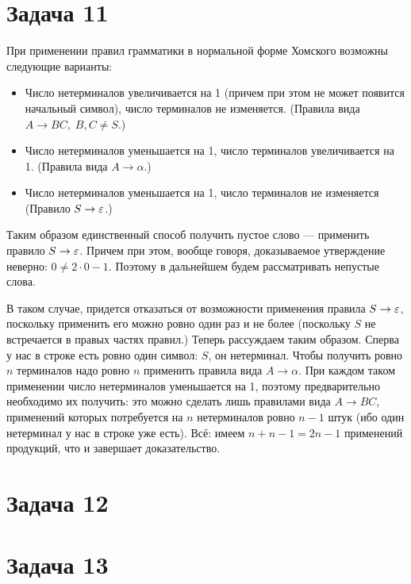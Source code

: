 \documentclass[12pt]{article}
\begin{document}
\section{Задача 11}
При применении правил грамматики в нормальной форме Хомского возможны следующие варианты:
\begin{itemize}
    \item Число нетерминалов увеличивается на 1 (причем при этом не может появится начальный символ), число терминалов не изменяется. (Правила вида $A\to BC,\;B,C\ne S$.)
    \item Число нетерминалов уменьшается на 1, число терминалов увеличивается на 1. (Правила вида $A\to \alpha$.)
    \item Число нетерминалов уменьшается на 1, число терминалов не изменяется (Правило $S\to\varepsilon$.)
\end{itemize}
Таким образом единственный способ получить пустое слово --- применить правило $S\to\varepsilon$. Причем при этом, вообще говоря, доказываемое утверждение неверно: $0\ne 2\cdot 0 - 1$. Поэтому в дальнейшем будем рассматривать непустые слова.

В таком случае, придется отказаться от возможности применения правила $S\to\varepsilon$, поскольку применить его можно ровно один раз и не более (поскольку $S$ не встречается в правых частях правил.) Теперь рассуждаем таким образом. Сперва у нас в строке есть ровно один символ: $S$, он нетерминал. Чтобы получить ровно $n$ терминалов надо ровно $n$ применить правила вида $A\to\alpha$. При каждом таком применении число нетерминалов уменьшается на 1, поэтому предварительно необходимо их получить: это можно сделать лишь правилами  вида $A\to BC$, применений которых потребуется на $n$ нетерминалов ровно $n-1$ штук (ибо один нетерминал у нас в строке уже есть). Всё: имеем $n+n-1=2n-1$ применений продукций, что и завершает доказательство.

\section{Задача 12}

\section{Задача 13}
\end{document}
